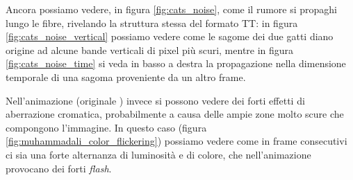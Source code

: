 \documentclass[11pt,a4paper]{article}
\begin{document}
Ancora possiamo vedere, in figura \ref{fig:cats_noise}, come il rumore si propaghi lungo le fibre, rivelando la struttura stessa del formato TT: in figura \ref{fig:cats_noise_vertical} possiamo vedere come le sagome dei due gatti diano origine ad alcune bande verticali di pixel più scuri, mentre in figura \ref{fig:cats_noise_time} si veda in basso a destra la propagazione nella dimensione temporale di una sagoma proveniente da un altro frame.

Nell'animazione \href{http://poisson.phc.unipi.it/~bianucci/shared/tesi/muhammad_ali_TT.gif}{} (originale \href{http://poisson.phc.unipi.it/~bianucci/shared/tesi/muhammad_ali.gif}{}) invece si possono vedere dei forti effetti di aberrazione cromatica, probabilmente a causa delle ampie zone molto scure che compongono l'immagine. In questo caso (figura \ref{fig:muhammadali_color_flickering}) possiamo vedere come in frame consecutivi ci sia una forte alternanza di luminosità e di colore, che nell'animazione provocano dei forti \emph{flash}.
\end{document}
